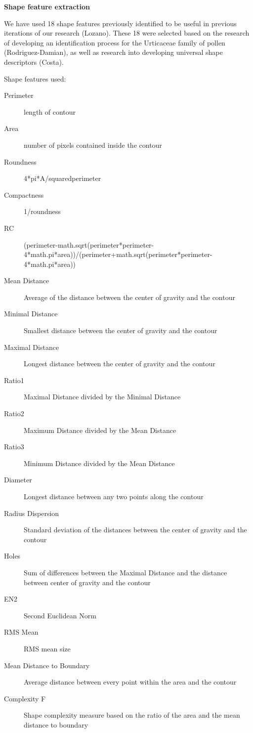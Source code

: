 \textbf{Shape feature extraction}

We have used 18 shape features previously identified to be useful in previous iterations of our research (Lozano). These 18 were selected based on the research of developing an identification process for the Urticaceae family of pollen (Rodriguez-Damian), as well as research into developing universal shape descriptors (Costa).

Shape features used:

\begin{description}
\item[Perimeter] length of contour
\item[Area] number of pixels contained inside the contour
\item[Roundness] 4*pi*A/squaredperimeter
\item[Compactness] 1/roundness
\item[RC] (perimeter-math.sqrt(perimeter*perimeter-4*math.pi*area))/(perimeter+math.sqrt(perimeter*perimeter-4*math.pi*area))
\item[Mean Distance] Average of the distance between the center of gravity and the contour
\item[Minimal Distance] Smallest distance between the center of gravity and the contour
\item[Maximal Distance] Longest distance between the center of gravity and the contour
\item[Ratio1] Maximal Distance divided by the Minimal Distance
\item[Ratio2] Maximum Distance divided by the Mean Distance
\item[Ratio3] Minimum Distance divided by the Mean Distance
\item[Diameter] Longest distance between any two points along the contour
\item[Radius Dispersion] Standard deviation of the distances between the center of gravity and the contour
\item[Holes] Sum of differences between the Maximal Distance and the distance between center of gravity and the contour
\item[EN2] Second Euclidean Norm
\item[RMS Mean] RMS mean size
\item[Mean Distance to Boundary] Average distance between every point within the area and the contour
\item[Complexity F] Shape complexity measure based on the ratio of the area and the mean distance to boundary
\end{description}



  